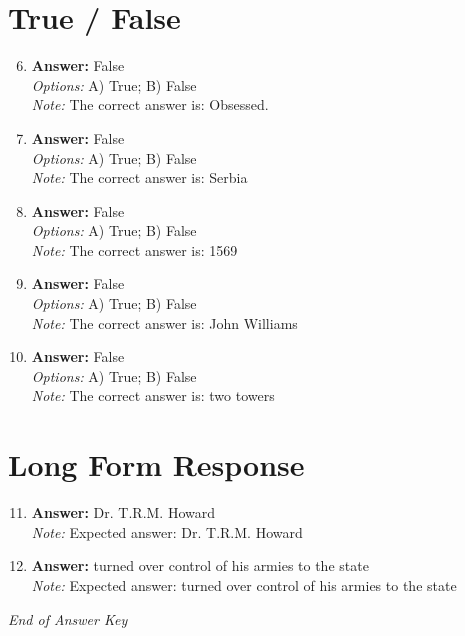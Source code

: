 \documentclass[12pt]{article}
\begin{document}
\section*{True / False}
\begin{enumerate}[label=\arabic*.]
\setcounter{enumi}{5}
\item \textbf{Answer:} False
\\ \textit{Options:} A) True; B) False
\\ \textit{Note:} The correct answer is: Obsessed.
\item \textbf{Answer:} False
\\ \textit{Options:} A) True; B) False
\\ \textit{Note:} The correct answer is: Serbia
\item \textbf{Answer:} False
\\ \textit{Options:} A) True; B) False
\\ \textit{Note:} The correct answer is: 1569
\item \textbf{Answer:} False
\\ \textit{Options:} A) True; B) False
\\ \textit{Note:} The correct answer is: John Williams
\item \textbf{Answer:} False
\\ \textit{Options:} A) True; B) False
\\ \textit{Note:} The correct answer is: two towers
\end{enumerate}

\section*{Long Form Response}
\begin{enumerate}[label=\arabic*.]
\setcounter{enumi}{10}
\item \textbf{Answer:} Dr. T.R.M. Howard
\\ \textit{Note:} Expected answer: Dr. T.R.M. Howard
\item \textbf{Answer:} turned over control of his armies to the state
\\ \textit{Note:} Expected answer: turned over control of his armies to the state
\end{enumerate}

\vfill
\noindent\textit{End of Answer Key}
\end{document}
